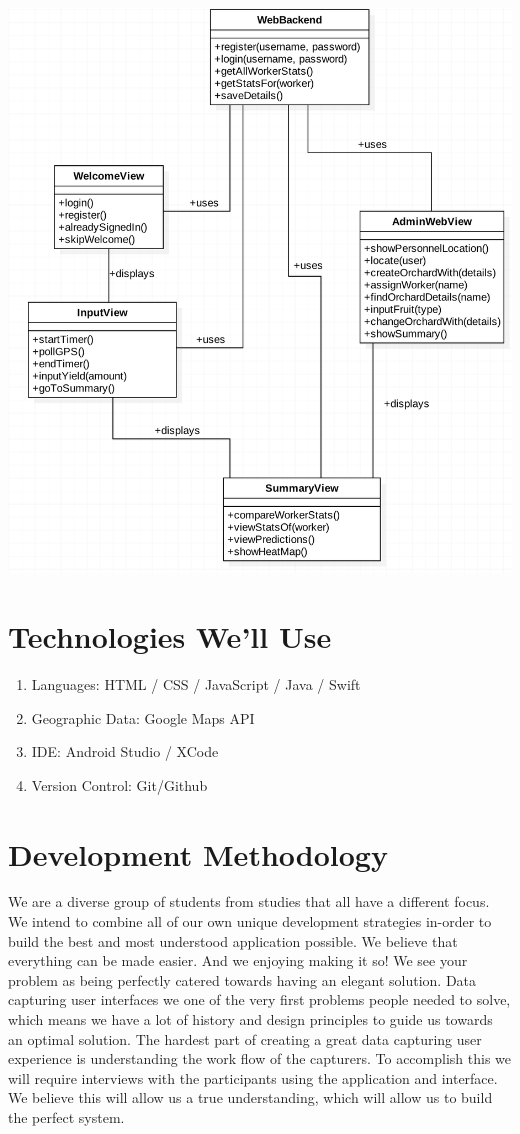 \documentclass[12pt]{article}
\begin{document}
	\includegraphics[scale=0.45]{Harvest.png}
	\newpage
	
	\section*{Technologies We'll Use}
	\begin{enumerate}
	\item Languages: HTML / CSS / JavaScript / Java / Swift
	\item Geographic Data: Google Maps API
	\item IDE: Android Studio / XCode
	\item Version Control: Git/Github
	\end{enumerate}
	
	\section*{Development Methodology}
	We are a diverse group of students from studies that all have a different focus. We intend to combine all of our own unique development strategies in-order to build the best and most understood application possible. We believe that everything can be made easier. And we enjoying making it so! We see your problem as being perfectly catered towards having an elegant solution. Data capturing user interfaces we one of the very first problems people needed to solve, which means we have a lot of history and design principles to guide us towards an optimal solution. The hardest part of creating a great data capturing user experience is understanding the work flow of the capturers. To accomplish this we will require interviews with the participants using the application and interface. We believe this will allow us a true understanding, which will allow us to build the perfect system.
	
\end{document}
